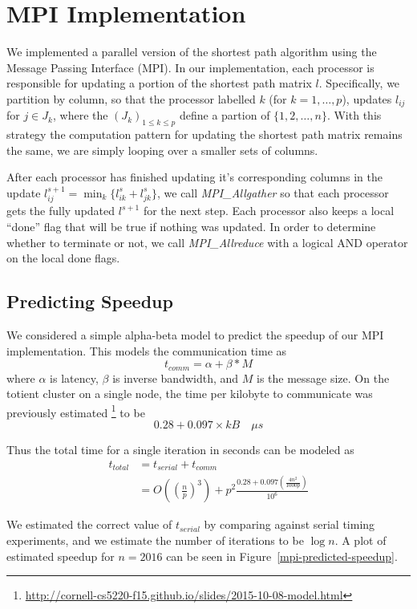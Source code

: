 \documentclass[11pt]{article}
\begin{document}
\section*{MPI Implementation}

We implemented a parallel version of the shortest path algorithm using the
Message Passing Interface (MPI).
In our implementation, each processor is responsible for updating a portion of 
the shortest path matrix $l$.  Specifically, we partition by column, so that 
the processor labelled $k$ (for $k = 1, \ldots, p$), updates $l_{ij}$ for 
$j \in J_k$, where the $(J_k)_{1 \leq k \leq p}$ define a partion of 
$\{1, 2, \ldots, n\}$.
With this strategy the computation pattern for updating the shortest path matrix
remains the same, we are simply looping over a smaller sets of columns.

After each processor has finished updating it's corresponding columns in
the update $l_{ij}^{s+1} = \min_k \{ l^s_{ik} + l^s_{jk} \}$, we call
\emph{MPI\_Allgather} so that each processor gets the fully updated $l^{s+1}$
for the next step.  Each processor also keeps a local ``done'' flag that will
	be true if nothing was updated.  In order to determine whether to terminate
	or not, we call \emph{MPI\_Allreduce} with a logical AND operator on the local
	done flags.


\subsection*{Predicting Speedup}

We considered a simple alpha-beta model to predict the speedup of our MPI implementation.
This models the communication time as
\[ t_{comm} = \alpha + \beta * M \] 
where $\alpha$ is latency, $\beta$ is inverse bandwidth, and $M$ is the message size.
On the totient cluster on a single node, the time per kilobyte to communicate
was previously estimated
\footnote{\url{http://cornell-cs5220-f15.github.io/slides/2015-10-08-model.html}} to be
\[ 0.28 + 0.097 \times kB \quad \mu s \]

Thus the total time for a single iteration
in seconds can be modeled as
\begin{align*}
t_{total} &= t_{serial} + t_{comm} \\
&= O\left(\left(\frac{n}{p}\right)^3\right) 
    + p^2 \frac{0.28 + 0.097(\frac{4n^2}{1000 p})}{10^6}
\end{align*}

We estimated the correct value of $t_{serial}$ by comparing against serial timing 
experiments, and we estimate the number of iterations to be $\log n$.
A plot of estimated speedup for $n=2016$ can be seen in Figure~\ref{mpi-predicted-speedup}.
\end{document}
